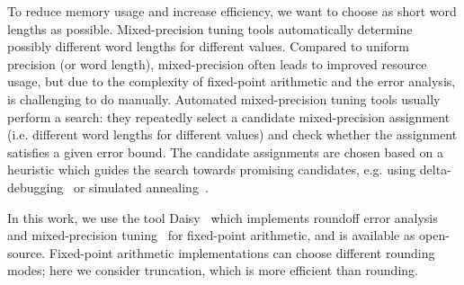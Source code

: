 To reduce memory usage and increase efficiency, we want to choose as short word
lengths as possible. Mixed-precision tuning tools automatically determine possibly different
word lengths for different values. Compared to uniform precision (or word length),
mixed-precision often leads to improved resource usage, but due to the complexity of
fixed-point arithmetic and the error analysis, is challenging to do manually.  
Automated mixed-precision tuning tools usually perform a search: they repeatedly
select a candidate mixed-precision assignment (i.e. different word lengths for
different values) and check whether the assignment satisfies a given error
bound. The candidate assignments are chosen based on a heuristic which guides
the search towards promising candidates, e.g. using delta-debugging~\cite{} or
simulated annealing~\cite{}.

In this work, we use the tool Daisy~\cite{} which implements roundoff error
analysis and mixed-precision tuning~\cite{} for fixed-point arithmetic, and is
available as open-source. Fixed-point arithmetic implementations can choose different
rounding modes; here we consider truncation, which is more efficient than
rounding.
